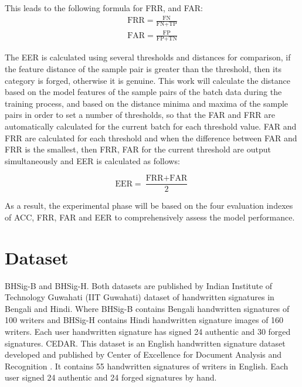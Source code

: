 This leads to the following formula for FRR, and FAR:
\begin{equation}
\label{eq21}
\begin{aligned}
	\text{FRR}=\frac{\text{FN}}{\text{FN}+\text{TP}} \\
	\text{FAR}=\frac{\text{FP}}{\text{FP}+\text{TN}}
\end{aligned}
\end{equation}

The EER is calculated using several thresholds and distances for comparison, if the feature distance of the sample pair is greater than the threshold, then its category is forged, otherwise it is genuine. This work will calculate the distance based on the model features of the sample pairs of the batch data during the training process, and based on the distance minima and maxima of the sample pairs in order to set a number of thresholds, so that the FAR and FRR are automatically calculated for the current batch for each threshold value. FAR and FRR are calculated for each threshold and when the difference between FAR and FRR is the smallest, then FRR, FAR for the current threshold are output simultaneously and EER is calculated as follows:

\begin{equation}
\label{eq22}
	\text{EER} = \frac{\text{FRR}+\text{FAR}}{2}	
\end{equation}
	
As a result, the experimental phase will be based on the four evaluation indexes of ACC, FRR, FAR and EER to comprehensively assess the model performance.

\newpage
\section{Dataset}

BHSig-B and BHSig-H. Both datasets are published by Indian Institute of Technology Guwahati (IIT Guwahati) \cite{3} dataset of handwritten signatures in Bengali and Hindi. Where BHSig-B contains Bengali handwritten signatures of 100 writers and BHSig-H contains Hindi handwritten signature images of 160 writers. Each user handwritten signature has signed 24 authentic and 30 forged signatures.
CEDAR. This dataset is an English handwritten signature dataset developed and published by Center of Excellence for Document Analysis and Recognition \cite{30}. It contains 55 handwritten signatures of writers in English. Each user signed 24 authentic and 24 forged signatures by hand.

